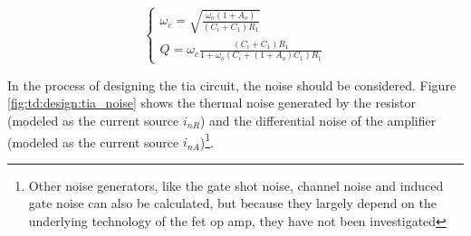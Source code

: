 \begin{equation}
	\begin{cases}
		\omega_c = \sqrt{\frac{\omega_o(1 + A_o)}{(C_i + C_1)R_1}}\\
		Q = \omega_c\frac{(C_i + C_1)R_1}{1 + \omega_o(C_i + (1 + A_o)C_1)R_1}
	\end{cases}
\end{equation}


In the process of designing the \gls{tia} circuit, the noise should be considered. Figure \ref{fig:td:design:tia_noise} shows the thermal noise generated by the resistor (modeled as the current source $i_{nR}$) and the differential noise of the amplifier (modeled as the current source $i_{nA}$)\footnote{Other noise generators, like the gate shot noise, channel noise and induced gate noise can also be calculated, but because they largely depend on the underlying technology of the \gls{fet} op amp, they have not been investigated}.

